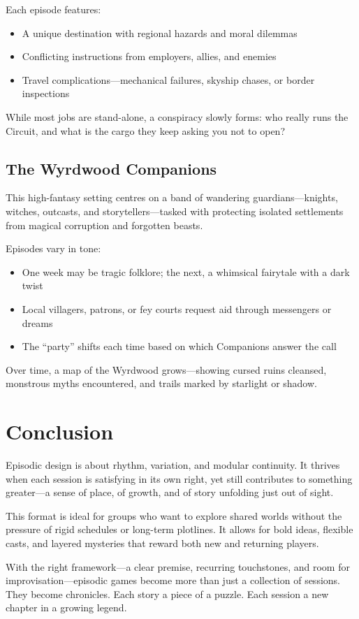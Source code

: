 Each episode features:
\begin{itemize}
    \item A unique destination with regional hazards and moral dilemmas
    \item Conflicting instructions from employers, allies, and enemies
    \item Travel complications—mechanical failures, skyship chases, or border inspections
\end{itemize}

While most jobs are stand-alone, a conspiracy slowly forms: who really runs the Circuit, and what is the cargo they keep asking you not to open?

\subsection*{The Wyrdwood Companions}

This high-fantasy setting centres on a band of wandering guardians—knights, witches, outcasts, and storytellers—tasked with protecting isolated settlements from magical corruption and forgotten beasts.

Episodes vary in tone:
\begin{itemize}
    \item One week may be tragic folklore; the next, a whimsical fairytale with a dark twist
    \item Local villagers, patrons, or fey courts request aid through messengers or dreams
    \item The “party” shifts each time based on which Companions answer the call
\end{itemize}

Over time, a map of the Wyrdwood grows—showing cursed ruins cleansed, monstrous myths encountered, and trails marked by starlight or shadow.

\section{Conclusion}

Episodic design is about rhythm, variation, and modular continuity. It thrives when each session is satisfying in its own right, yet still contributes to something greater—a sense of place, of growth, and of story unfolding just out of sight.

This format is ideal for groups who want to explore shared worlds without the pressure of rigid schedules or long-term plotlines. It allows for bold ideas, flexible casts, and layered mysteries that reward both new and returning players.

With the right framework—a clear premise, recurring touchstones, and room for improvisation—episodic games become more than just a collection of sessions. They become chronicles. Each story a piece of a puzzle. Each session a new chapter in a growing legend.

